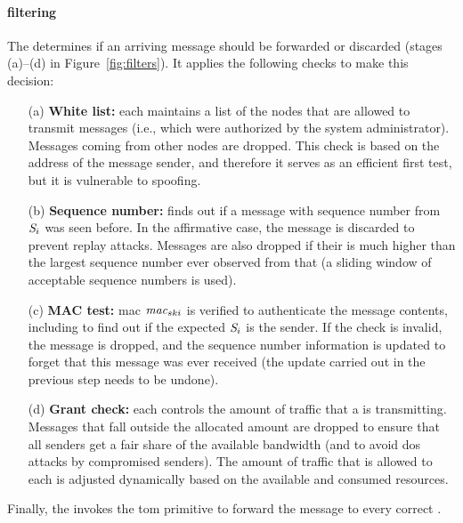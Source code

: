 \paragraph{\Presieve filtering}

The \presieve determines if an arriving message \msg should be forwarded or discarded (stages (a)--(d) in Figure~\ref{fig:filters}). It applies the following checks to make this decision:

\begin{enumerate}

\item[(a)] \textbf{White list:} each \presieve maintains a list of the nodes that are allowed to transmit messages (i.e., which were authorized by the system administrator). 
Messages coming from other nodes are dropped.
This check is based on the address of the message sender, and therefore it serves as an efficient first test, but it is vulnerable to spoofing.

\item[(b)]  \textbf{Sequence number:} finds out if a message with sequence number \sn from \sender $\emph{S}_i$ was seen before.
In the affirmative case, the message is discarded to prevent replay attacks.
Messages are also dropped if their \sn is much higher than the largest sequence number ever observed from that \sender (a sliding window of acceptable sequence numbers is used).

\item[(c)]  \textbf{MAC test:} \gls{mac} $\emph{mac}_{ski}$ is verified to authenticate the message contents, including to find out if the expected $\emph{S}_i$  is the sender. 
If the check is invalid, the message is dropped, and the sequence number information is updated to forget that this message was ever received (the update carried out in the previous step needs to be undone).

\item[(d)] \textbf{Grant check:} each \presieve controls the amount of traffic that a \sender is transmitting.
Messages that fall outside the allocated amount are dropped to ensure that all senders get a fair share of the available bandwidth (and to avoid \gls{dos} attacks by compromised senders).
The amount of traffic that is allowed to each \sender is adjusted dynamically based on the available and consumed resources.


\end{enumerate}


Finally, the \presieve invokes the \gls{tom} primitive to forward the message to every correct \repsieve.

